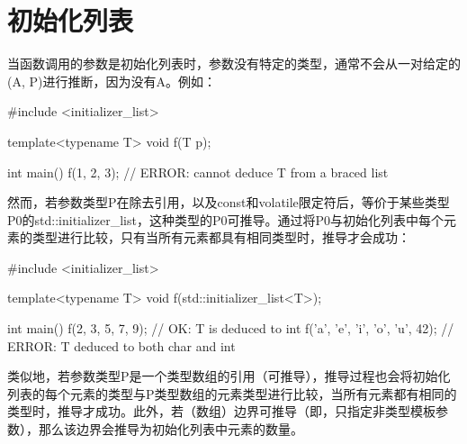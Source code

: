 \section{初始化列表}
当函数调用的参数是初始化列表时，参数没有特定的类型，通常不会从一对给定的(A, P)进行推断，因为没有A。例如：

\begin{cpp}
#include <initializer_list>

template<typename T> void f(T p);

int main() {
	f({1, 2, 3}); // ERROR: cannot deduce T from a braced list
}
\end{cpp}

然而，若参数类型P在除去引用，以及const和volatile限定符后，等价于某些类型P0的std::initializer\_list，这种类型的P0可推导。通过将P0与初始化列表中每个元素的类型进行比较，只有当所有元素都具有相同类型时，推导才会成功：

\begin{cpp}
#include <initializer_list>

template<typename T> void f(std::initializer_list<T>);

int main() {
	f({2, 3, 5, 7, 9}); // OK: T is deduced to int
	f({'a', 'e', 'i', 'o', 'u', 42}); // ERROR: T deduced to both char and int
}
\end{cpp}

类似地，若参数类型P是一个类型数组的引用（可推导），推导过程也会将初始化列表的每个元素的类型与P类型数组的元素类型进行比较，当所有元素都有相同的类型时，推导才成功。此外，若（数组）边界可推导（即，只指定非类型模板参数），那么该边界会推导为初始化列表中元素的数量。












































